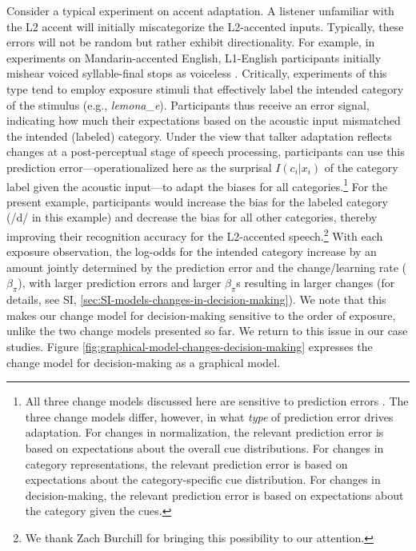 \documentclass[
  11pt,
  man,floatsintext]{apa6}
\begin{document}
Consider a typical experiment on accent adaptation. A listener unfamiliar with the L2 accent will initially miscategorize the L2-accented inputs. Typically, these errors will not be random but rather exhibit directionality. For example, in experiments on Mandarin-accented English, L1-English participants initially mishear voiced syllable-final stops as voiceless \autocites[e.g., hearing \emph{lid} as \emph{lit},][]{flege1992,xie2016jep}. Critically, experiments of this type tend to employ exposure stimuli that effectively label the intended category of the stimulus (e.g., \emph{lemona\_e}). Participants thus receive an error signal, indicating how much their expectations based on the acoustic input mismatched the intended (labeled) category. Under the view that talker adaptation reflects changes at a post-perceptual stage of speech processing, participants can use this prediction error---operationalized here as the surprisal \(I(c_i|x_i)\) of the category label given the acoustic input---to adapt the biases for all categories.\footnote{All three change models discussed here are sensitive to prediction errors \autocite[e.g., for Bayesian belief-updating, sensitivity to the prediction error is a side-effect of optimal information integration, as demonstrated e.g., in][]{jaeger2019}. The three change models differ, however, in what \emph{type} of prediction error drives adaptation. For changes in normalization, the relevant prediction error is based on expectations about the overall cue distributions. For changes in category representations, the relevant prediction error is based on expectations about the category-specific cue distribution. For changes in decision-making, the relevant prediction error is based on expectations about the category given the cues.} For the present example, participants would increase the bias for the labeled category (/d/ in this example) and decrease the bias for all other categories, thereby improving their recognition accuracy for the L2-accented speech.\footnote{We thank Zach Burchill for bringing this possibility to our attention.} With each exposure observation, the log-odds for the intended category increase by an amount jointly determined by the prediction error and the change/learning rate (\(\beta_{\pi}\)), with larger prediction errors and larger \(\beta_{\pi}\)s resulting in larger changes (for details, see SI, \ref{sec:SI-models-changes-in-decision-making}). We note that this makes our change model for decision-making sensitive to the order of exposure, unlike the two change models presented so far. We return to this issue in our case studies. Figure \ref{fig:graphical-model-changes-decision-making} expresses the change model for decision-making as a graphical model.
\end{document}
